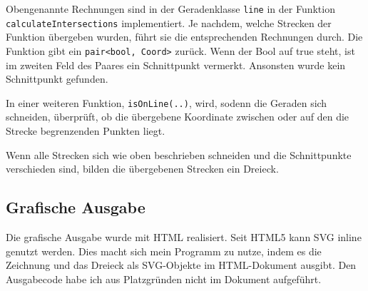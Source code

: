 Obengenannte Rechnungen sind in der Geradenklasse \texttt{line} in der Funktion
\texttt{calculateIntersections} implementiert.
Je nachdem, welche Strecken der Funktion übergeben wurden,
führt sie die entsprechenden Rechnungen durch.
Die Funktion gibt ein \texttt{pair<bool, Coord>} zurück.
Wenn der Bool auf true steht,
ist im zweiten Feld des Paares ein Schnittpunkt vermerkt.
Ansonsten wurde kein Schnittpunkt gefunden.

In einer weiteren Funktion, \texttt{isOnLine(..)}, wird, sodenn
die Geraden sich schneiden, überprüft, ob die übergebene Koordinate zwischen
oder auf den die Strecke begrenzenden Punkten liegt.

Wenn alle Strecken sich wie oben beschrieben schneiden und die Schnittpunkte verschieden
sind, bilden die übergebenen Strecken ein Dreieck.

\subsection {Grafische Ausgabe}
Die grafische Ausgabe wurde mit HTML realisiert. Seit HTML5 kann SVG inline genutzt
werden.
Dies macht sich mein Programm zu nutze, indem es die Zeichnung und das Dreieck
als SVG-Objekte im HTML-Dokument ausgibt.
Den Ausgabecode habe ich aus Platzgründen nicht im Dokument aufgeführt.
